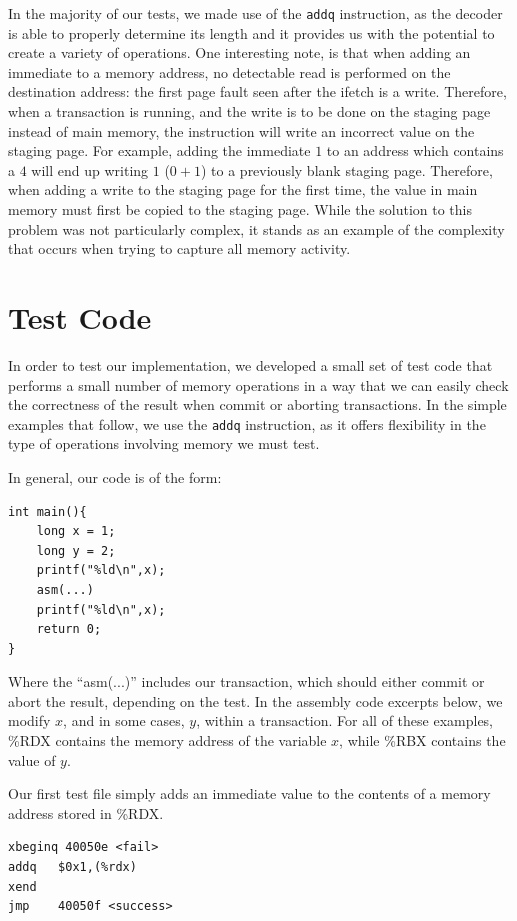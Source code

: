 \documentclass{acm_proc_article-sp}
\begin{document}
In the majority of our tests, we made use of the \texttt{addq} instruction, as the 
decoder is able to properly determine its length and it provides us with the
potential to create a variety of operations. One interesting note, is that when
adding an immediate to a memory address, no detectable read is performed on
the destination address: the first page fault seen after the ifetch is a write.
Therefore, when a transaction is running, and the write is to be done on the
staging page instead of main memory, the instruction will write an incorrect
value on the staging page. For example, adding the immediate $1$ to an address
which contains a $4$ will end up writing $1$ ($0+1$) to a previously blank
staging page. Therefore, when adding a write to the staging page for the first
time, the value in main memory must first be copied to the staging page. While
the solution to this problem was not particularly complex, it stands as an 
example of the complexity that occurs when trying to capture all memory 
activity.
 
\section{Test Code}

In order to test our implementation, we developed a small set of test code that
performs a small number of memory operations in a way that we can easily check
the correctness of the result when commit or aborting transactions. 
In the simple examples that follow, we use the \texttt{addq} instruction, as it
offers flexibility in the type of operations involving memory we must test.

In general, our code is of the form:
\begin{verbatim}
int main(){
    long x = 1;
    long y = 2;
    printf("%ld\n",x);  
    asm(...)
    printf("%ld\n",x);  
    return 0;
}
\end{verbatim} 

Where the ``asm(...)'' includes our transaction, which should either commit or
abort the result, depending on the test. In the assembly code excerpts below,
we modify $x$, and in some cases, $y$, within a transaction.  For all of these
examples, \%RDX contains the memory address of the variable $x$, while \%RBX
contains the value of $y$.

Our first test file simply adds an immediate value to the contents of a memory
address stored in \%RDX.

\begin{verbatim}
xbeginq 40050e <fail>
addq   $0x1,(%rdx)
xend   
jmp    40050f <success>
\end{verbatim}
\end{document}
